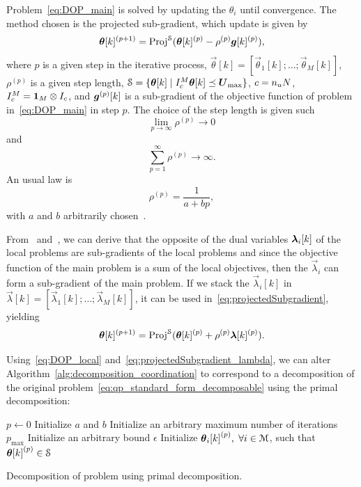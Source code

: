 \documentclass[../main.tex]{subfiles}
\begin{document}
Problem~\eqref{eq:DOP_main} is solved by updating the $\theta_{i}$ until convergence. The method chosen is the projected sub-gradient, which update is given by
\begin{equation}
  \label{eq:projectedSubgradient}
\boldsymbol{\theta}[k]^{(p+1)}=\operatorname{Proj}^{\mathcal{S}}(\boldsymbol{\theta}[k]^{(p)}-\rho^{(p)}\boldsymbol{g}[k]^{(p)}),
\end{equation}
where $p$ is a given step in the iterative process, $\vec{\theta}[k]=[\vec{\theta}_{1}[k];\dots;\vec{\theta}_{M}[k]]$,
$\rho^{(p)}$ is a given step length,
${\mathcal{S} = \{\boldsymbol{\theta}[k]\mid I_{c}^{M}\boldsymbol{\theta}[k]\preceq \boldsymbol{U}_{\max}\}}$,
${c=n_{u}N}$,
${I_{c}^{M}=\mathbf{1}_{M}\otimes I_{c}}$,
and
$\boldsymbol{g}^{(p)}[k]$ is a sub-gradient of the objective function of problem in~\eqref{eq:DOP_main} in step $p$.
The choice of the step length is given such
\[\lim_{p\to\infty}\rho^{(p)}\to0\]
and
\[\sum_{p=1}^{\infty}\rho^{(p)}\to\infty.\]
An usual law is
\[\rho^{(p)}=\frac{1}{a+bp},\]
with $a$ and $b$ arbitrarily chosen~\cite{ConejoEtAl2006}.

From~\cite{BoydVandenberghe2004} and~\cite{BoydEtAl2015}, we can derive that the opposite of the dual variables $\lambdaik$ of the local problems are sub-gradients of the local problems and since the objective function of the main problem is a sum of the local objectives, then the $\vec{\lambda}_{i}$ can form a sub-gradient of the main problem.
If we stack the $\vec{\lambda}_{i}[k]$ in $\vec{\lambda}[k]=[\vec{\lambda}_{1}[k];\dots;\vec{\lambda}_{M}[k]]$, it can be used in~\eqref{eq:projectedSubgradient}, yielding
\begin{equation}
  \label{eq:projectedSubgradient_lambda}
  \boldsymbol{\theta}[k]^{(p+1)}=\operatorname{Proj}^{\mathcal{S}}(\boldsymbol{\theta}[k]^{(p)}+\rho^{(p)}\boldsymbol{\lambda}[k]^{(p)}).
\end{equation}

Using~\eqref{eq:DOP_local} and~\eqref{eq:projectedSubgradient_lambda}, we can alter Algorithm~\ref{alg:decomposition_coordination} to correspond to a decomposition of the original \mpc{} problem~\eqref{eq:qp_standard_form_decomposable} using the primal decomposition:
\begin{algorithm2e}[h]
  \DontPrintSemicolon%
  $p\gets 0$\;
  Initialize $a$ and $b$\;
  Initialize an arbitrary maximum number of iterations $p_{\max}$\;
  Initialize an arbitrary bound $\epsilon$\;
  Initialize ${\thetaik}^{(p)},$ $\forall i\in\mathcal{M}$, such that ${\boldsymbol{\theta}[k]}^{(p)}\in\mathcal{S}$\;
  \caption{Decomposition of \mpc{} problem using primal decomposition.}\label{alg:primal_decomposition}
\end{algorithm2e}
\end{document}
